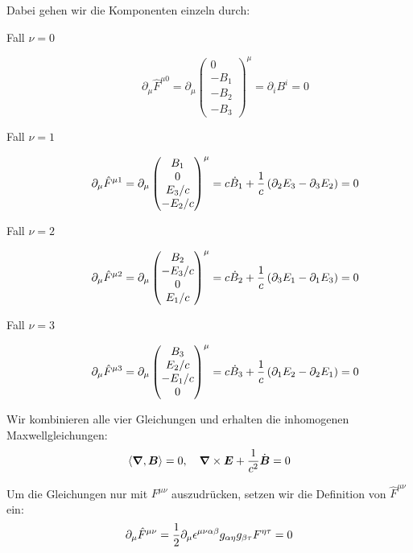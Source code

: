 Dabei gehen wir die Komponenten einzeln durch:
\begin{description}
	\item[Fall $\nu = 0$]
		\[
			\partial_\mu \hat F^{\mu 0}
			=
			\partial_\mu
			\begin{pmatrix}
				0 \\ -B_1 \\ -B_2 \\ -B_3
			\end{pmatrix}^\mu
			=
			\partial_i B^i = 0
		\]

	\item[Fall $\nu = 1$]
		\[
			\partial_\mu \hat F^{\mu 1}
			=
			\partial_\mu
			\begin{pmatrix}
				B_1 \\ 0 \\ E_3/c \\ -E_2/c
			\end{pmatrix}^\mu
			= c \dot B_1 + \frac 1c \del{\partial_2 E_3 - \partial_3 E_2}
			= 0
		\]

	\item[Fall $\nu = 2$]
		\[
			\partial_\mu \hat F^{\mu 2}
			=
			\partial_\mu
			\begin{pmatrix}
				B_2 \\ -E_3/c \\ 0 \\ E_1/c
			\end{pmatrix}^\mu
			= c \dot B_2 + \frac 1c \del{\partial_3 E_1 - \partial_1 E_3}
			= 0
		\]

	\item[Fall $\nu = 3$]
		\[
			\partial_\mu \hat F^{\mu 3}
			=
			\partial_\mu
			\begin{pmatrix}
				B_3 \\ E_2/c \\ -E_1/c \\ 0
			\end{pmatrix}^\mu
			= c \dot B_3 + \frac 1{c} \del{\partial_1 E_2 - \partial_2 E_1}
			= 0
		\]
\end{description}

Wir kombinieren alle vier Gleichungen und erhalten die inhomogenen
Maxwellgleichungen:
\[
	\left\langle \boldsymbol{\nabla}, \boldsymbol{B} \right\rangle = 0
	,\quad
	\boldsymbol{\nabla} \times \boldsymbol{E} + \frac 1{c^2} \dot{\boldsymbol{B}} = 0
\]

Um die Gleichungen nur mit $F^{\mu\nu}$ auszudrücken, setzen wir die Definition
von $\hat F^{\mu\nu}$ ein:
\[
	\partial_\mu \hat F^{\mu\nu}
	= \frac 12 \partial_\mu \epsilon^{\mu\nu\alpha\beta} g_{\alpha\eta} g_{\beta\tau} F^{\eta\tau}
	= 0
\]

